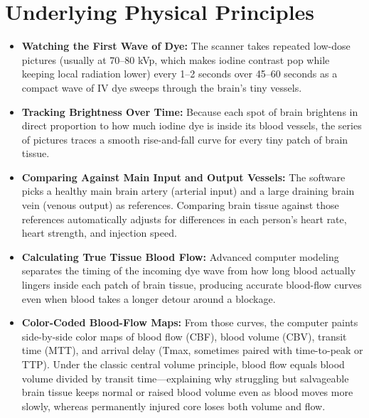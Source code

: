 \section{Underlying Physical Principles}
\begin{itemize}
    \item \textbf{Watching the First Wave of Dye:} The scanner takes repeated low-dose pictures (usually at 70--80 kVp, which makes iodine contrast pop while keeping local radiation lower) every 1--2 seconds over 45--60 seconds as a compact wave of IV dye sweeps through the brain's tiny vessels.
    \item \textbf{Tracking Brightness Over Time:} Because each spot of brain brightens in direct proportion to how much iodine dye is inside its blood vessels, the series of pictures traces a smooth rise-and-fall curve for every tiny patch of brain tissue.
    \item \textbf{Comparing Against Main Input and Output Vessels:} The software picks a healthy main brain artery (arterial input) and a large draining brain vein (venous output) as references. Comparing brain tissue against those references automatically adjusts for differences in each person's heart rate, heart strength, and injection speed.
    \item \textbf{Calculating True Tissue Blood Flow:} Advanced computer modeling separates the timing of the incoming dye wave from how long blood actually lingers inside each patch of brain tissue, producing accurate blood-flow curves even when blood takes a longer detour around a blockage.
    \item \textbf{Color-Coded Blood-Flow Maps:} From those curves, the computer paints side-by-side color maps of blood flow (CBF), blood volume (CBV), transit time (MTT), and arrival delay (Tmax, sometimes paired with time-to-peak or TTP). Under the classic central volume principle, blood flow equals blood volume divided by transit time---explaining why struggling but salvageable brain tissue keeps normal or raised blood volume even as blood moves more slowly, whereas permanently injured core loses both volume and flow.
\end{itemize}

